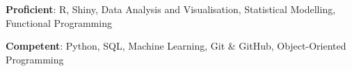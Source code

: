 \textbf{Proficient}: R, Shiny, Data Analysis and Visualisation, Statistical Modelling, Functional Programming

\textbf{Competent}: Python, SQL, Machine Learning, Git \& GitHub, Object-Oriented Programming

